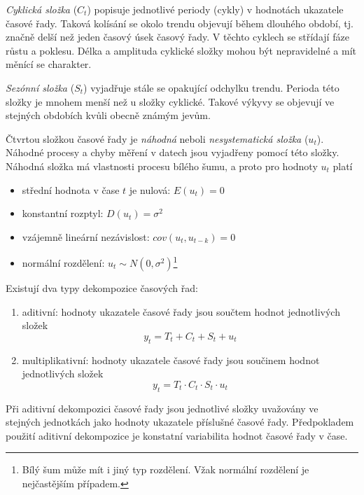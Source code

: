 \documentclass[a4paper,12pt,twoside]{scrreprt}
\begin{document}
\textit{Cyklická složka} ($C_t$) popisuje jednotlivé periody (cykly) v hodnotách ukazatele časové řady. Taková kolísání se okolo trendu objevují během dlouhého období, tj. značně delší než jeden časový úsek časový řady. V těchto cyklech se střídají fáze růstu a poklesu. Délka a amplituda cyklické složky mohou být nepravidelné a mít měnící se charakter. 

\textit{Sezónní složka} ($S_t$) vyjadřuje stále se opakující odchylku trendu. Perioda této složky je mnohem menší než u složky cyklické. Takové výkyvy se objevují ve stejných obdobích kvůli obecně známým jevům.

Čtvrtou složkou časové řady je \textit{náhodná} neboli \textit{nesystematická složka} ($u_t$). \\ Náhodné procesy a chyby měření v datech jsou vyjadřeny pomocí této složky. Náhodná složka má vlastnosti procesu bílého šumu, a proto pro hodnoty $u_t$ platí

\begin{itemize}
\item střední hodnota v čase $t$ je nulová: $E(u_t) = 0$
\item konstantní rozptyl: $D(u_t) = \sigma^2$
\item vzájemně lineární nezávislost: $cov(u_t, u_{t-k}) = 0$ 
\item normální rozdělení: $u_t \sim N(0, \sigma^2)$\footnote{Bílý šum může mít i jiný typ rozdělení. Vžak normální rozdělení je nejčastějším případem.}
\end{itemize}

Existují dva typy dekompozice časových řad:

\begin{enumerate}

\item aditivní: hodnoty ukazatele časové řady jsou součtem hodnot jednotlivých složek
\begin{equation}
y_t = T_t + C_t + S_t + u_t
\end{equation}

\item multiplikativní: hodnoty ukazatele časové řady jsou součinem hodnot jednotlivých složek 
\begin{equation}
y_t = T_t \cdot C_t \cdot S_t \cdot u_t
\end{equation}

\end{enumerate}

Při aditivní dekompozici časové řady jsou jednotlivé složky uvažovány ve \\ stejných jednotkách jako hodnoty ukazatele příslušné časové řady. Předpokladem použití aditivní dekompozice je konstatní variabilita hodnot časové řady v čase.
\end{document}
